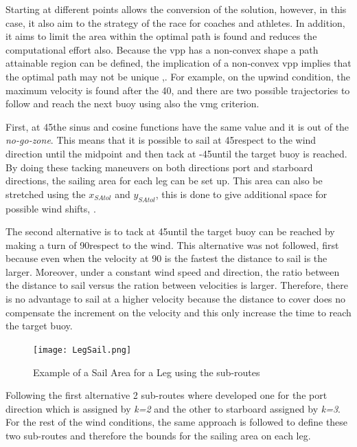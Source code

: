 Starting at different points allows the conversion of the solution, however, in this case, it also aim to the strategy of the race for coaches and athletes. In addition, it aims to limit the area within the optimal path is found and reduces the computational effort also. Because the \acrshort{vpp} has a non-convex shape a path attainable region can be defined, the implication of a non-convex \acrshort{vpp} implies that the optimal path may not be unique \cite{dolinskaya2012time},\cite{dolinskaya2013fastest}.  For example, on the upwind condition, the maximum velocity is found after the 40\degree, and there are two possible trajectories to follow and reach the next buoy using also the \acrshort{vmg} criterion. \par 
First, at 45\degree the sinus and cosine functions have the same value and it is out of the \textit{no-go-zone}. This means that it is possible to sail at 45\degree respect to the wind direction until the midpoint %
and then tack at -45\degree until the target buoy is reached. By doing these tacking maneuvers on both directions port and starboard directions, the sailing area for each leg can be set up. This area can also be stretched using the $x_{SAtol}$ and $y_{SAtol}$, this is done to give additional space for possible wind shifts, \cite{xing2012path}. \par \noindent
The second alternative is to tack at 45\degree until the target buoy can be reached by making a turn of 90\degree respect to the wind. This alternative was not followed, first because even when the velocity at 90 \degree is the fastest the distance to sail is the larger. Moreover, under a constant wind speed and  direction, the ratio between the distance to sail versus the ration between velocities is larger. Therefore, there is no advantage to sail at a higher velocity because the distance to cover does no compensate the increment on the velocity and this only increase the time to reach the target buoy. \par 
\begin{figure}[hbt!]
    \centering
    \texttt{[image: LegSail.png]}
    \caption{Example of a Sail Area for a Leg using the sub-routes}
    \label{fig:LegSailArea}
\end{figure}
Following the first alternative 2 sub-routes where developed one for the port direction which is assigned by \textit{k=2} and the other to starboard assigned by \textit{k=3}. For the rest of the wind conditions, the same approach is followed to define these two sub-routes and therefore the bounds for the sailing area on each leg.  \par
